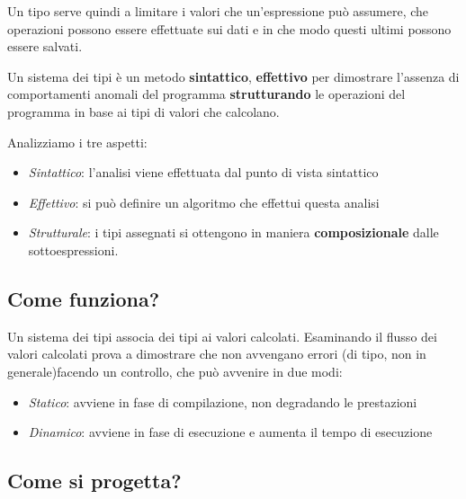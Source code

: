 \noindent Un tipo serve quindi a limitare i valori che un'espressione può assumere, che operazioni possono essere effettuate sui dati e in che modo questi ultimi possono essere salvati.

\begin{definition}
	Un sistema dei tipi è un metodo \textbf{sintattico}, \textbf{effettivo} per dimostrare
	l'assenza di comportamenti anomali del programma \textbf{strutturando} le
	operazioni del programma in base ai tipi di valori che calcolano.
\end{definition}
\noindent Analizziamo i tre aspetti:
\begin{itemize}
	\item \textit{Sintattico}:  l'analisi viene effettuata dal punto di vista sintattico
	\item \textit{Effettivo}: si può definire un algoritmo che effettui questa analisi
	\item \textit{Strutturale}: i tipi assegnati si ottengono in maniera \textbf{composizionale} dalle sottoespressioni.
\end{itemize}

\subsection{Come funziona?}
Un sistema dei tipi associa dei tipi ai valori calcolati. Esaminando il flusso dei valori calcolati prova a dimostrare che non avvengano errori (di tipo, non in generale)facendo un controllo, che può avvenire in due modi:
\begin{itemize}
	\item \textit{Statico}: avviene in fase di compilazione, non degradando le prestazioni
	\item  \textit{Dinamico}: avviene in fase di esecuzione e aumenta il tempo di esecuzione
\end{itemize}

\subsection{Come si progetta?}
